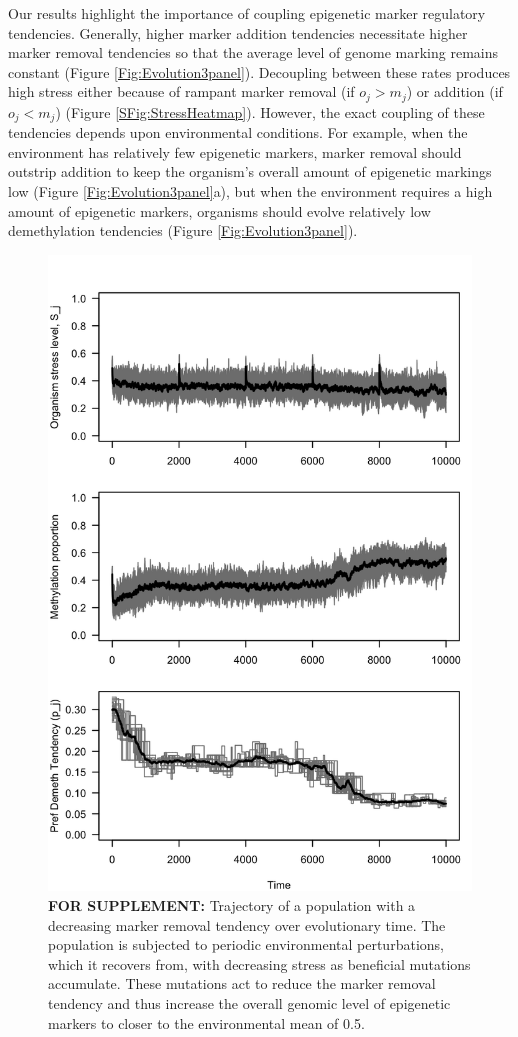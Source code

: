 \documentclass{article}
\begin{document}
Our results highlight the importance of coupling epigenetic marker regulatory tendencies. Generally, higher marker addition tendencies necessitate higher marker removal tendencies so that the average level of genome marking remains constant (Figure \ref{Fig:Evolution3panel}). Decoupling between these rates produces high stress either because of rampant marker removal (if $o_j > m_j$) or addition (if $o_j < m_j$) (Figure \ref{SFig:StressHeatmap}). However, the exact coupling of these tendencies depends upon environmental conditions. For example, when the environment has relatively few epigenetic markers, marker removal should outstrip addition to keep the organism's overall amount of epigenetic markings low (Figure \ref{Fig:Evolution3panel}a), but when the environment requires a high amount of epigenetic markers, organisms should evolve relatively low demethylation tendencies (Figure \ref{Fig:Evolution3panel}).


\begin{figure}
    \centering
    \includegraphics[width=0.8 \textwidth]{Figures/SFig_EvolutionSims.png}
    \caption{\textbf{FOR SUPPLEMENT:} Trajectory of a population with a decreasing marker removal tendency over evolutionary time. The population is subjected to periodic environmental perturbations, which it recovers from, with decreasing stress as beneficial mutations accumulate. These mutations act to reduce the marker removal tendency and thus increase the overall genomic level of epigenetic markers to closer to the environmental mean of 0.5.}
    \label{Sfig:evolutionts}
\end{figure}
\end{document}
